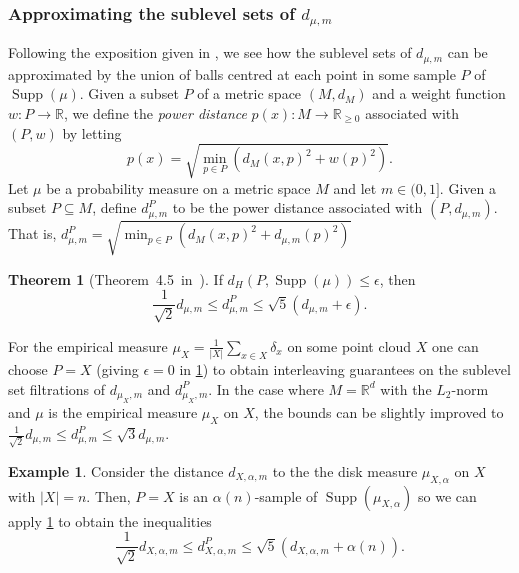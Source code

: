 \documentclass[10pt,a4paper]{article}
\theoremstyle{definition}
\newtheorem{thm}{Theorem}[section]
\newtheorem{ex}{Example}[thm]
\newcommand{\R}{\mathbb{R}}
\begin{document}
	\subsubsection{Approximating the sublevel sets of $d_{\mu,m}$}
 	Following the exposition given in \autocite{Buchet2013}, we see how the sublevel sets of $d_{\mu,m}$ can be approximated by the union of balls centred at each point in some sample $P$ of $\operatorname{Supp}(\mu)$. Given a subset $P$ of a metric space $(M, d_M)$ and a weight function $w\colon P\to\R$, we define the \textit{power distance} $p(x)\colon M\to\R_{\geq0}$ associated with $(P,w)$ by letting
 	$$
 	p(x)=\sqrt{\min_{p\in P}\left(d_M(x,p)^2+w(p)^2\right)}.
 	$$
 	Let $\mu$ be a probability measure on a metric space $M$ and let $m\in(0,1]$. Given a subset $P\subseteq M$, define $d_{\mu,m}^P$ to be the power distance associated with $(P,d_{\mu,m})$. That is, $d_{\mu,m}^P=\sqrt{\min_{p\in P}\left(d_M(x,p)^2+d_{\mu,m}(p)^2\right)}$
 	\begin{thm}[Theorem~4.5~in~\autocite{Buchet2013}]
 		\label{thm_power_distance_dtm_inequality}
 		If $d_H(P,\operatorname{Supp}(\mu))\leq\epsilon$, then $$\frac{1}{\sqrt{2}}d_{\mu,m}\leq d_{\mu,m}^P \leq \sqrt{5}(d_{\mu,m}+\epsilon).$$
 	\end{thm}
 	For the empirical measure $\mu_X = \frac{1}{|X|}\sum_{x\in X}\delta_x$ on some point cloud $X$ one can choose $P=X$ (giving $\epsilon=0$ in \cref{thm_power_distance_dtm_inequality}) to obtain interleaving guarantees on the sublevel set filtrations of $d_{\mu_X,m}$ and $d_{\mu_X,m}^P$. In the case where $M=\R^d$ with the $L_2$-norm and $\mu$ is the empirical measure $\mu_X$ on $X$, the bounds can be slightly improved to $\frac{1}{\sqrt{2}}d_{\mu,m}\leq d_{\mu,m}^P \leq \sqrt{3}d_{\mu,m}$.

	\begin{ex}
		Consider the distance $d_{X,\alpha, m}$ to the the disk measure $\mu_{X,\alpha}$ on $X$ with $|X|=n$. Then, $P=X$ is an $\alpha(n)$-sample of $\operatorname{Supp}(\mu_{X,\alpha})$ so we can apply \cref{thm_power_distance_dtm_inequality} to obtain the inequalities
		$$
		\frac{1}{\sqrt{2}}d_{X,\alpha, m}\leq d_{X,\alpha, m}^P \leq \sqrt{5}(d_{X,\alpha, m}+\alpha(n)).
		$$
	\end{ex}



	\printbibliography
	
\end{document}
